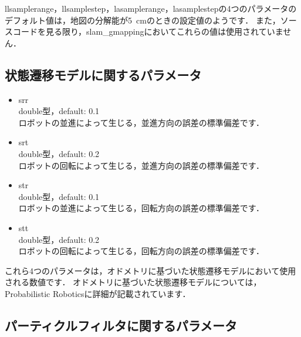 \documentclass[{../../master}]{subfiles}
\begin{document}
\textsf{llsamplerange}，\textsf{llsamplestep}，\textsf{lasamplerange}，\textsf{lasamplestep}の4つのパラメータのデフォルト値は，地図の分解能が\SI{5}{cm}のときの設定値のようです．
また，ソースコードを見る限り，\textsf{slam\_gmapping}においてこれらの値は使用されていません．

\subsection{状態遷移モデルに関するパラメータ}

\begin{itemize}
  \item \textsf{srr} \\
    double型，default: 0.1 \\
    ロボットの並進によって生じる，並進方向の誤差の標準偏差です．
  \item \textsf{srt} \\
    double型，default: 0.2 \\
    ロボットの回転によって生じる，並進方向の誤差の標準偏差です．
  \item \textsf{str} \\
    double型，default: 0.1 \\
    ロボットの並進によって生じる，回転方向の誤差の標準偏差です．
    \item \textsf{stt} \\
    double型，default: 0.2 \\
    ロボットの回転によって生じる，回転方向の誤差の標準偏差です．
\end{itemize}

これら4つのパラメータは，オドメトリに基づいた状態遷移モデルにおいて使用される数値です．
オドメトリに基づいた状態遷移モデルについては，Probabilistic Robotics\cite{thrun2005probabilistic}に詳細が記載されています．

\subsection{パーティクルフィルタに関するパラメータ}
\end{document}
